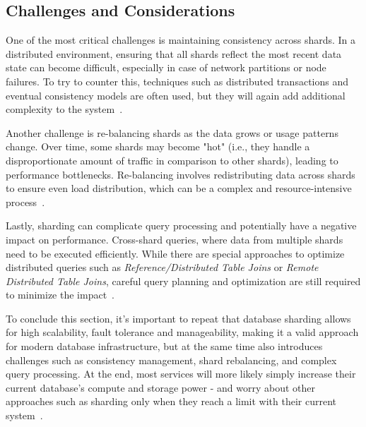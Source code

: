 \subsection{Challenges and Considerations}
One of the most critical challenges is maintaining consistency across shards. In a distributed environment, ensuring that all shards reflect the most recent data state can become difficult, especially in case of network partitions or node failures. To try to counter this, techniques such as distributed transactions and eventual consistency models are often used, but they will again add additional complexity to the system~\parencite{skyline_joins}.

Another challenge is re-balancing shards as the data grows or usage patterns change. Over time, some shards may become "hot" (i.e., they handle a disproportionate amount of traffic in comparison to other shards), leading to performance bottlenecks. Re-balancing involves redistributing data across shards to ensure even load distribution, which can be a complex and resource-intensive process~\parencite{db_sharding_cloud}.

Lastly, sharding can complicate query processing and potentially have a negative impact on performance. Cross-shard queries, where data from multiple shards need to be executed efficiently. While there are special approaches to optimize distributed queries such as \textit{Reference/Distributed Table Joins} or \textit{Remote Distributed Table Joins}, careful query planning and optimization are still required to minimize the impact~\parencite{db_sharding_joins}.

To conclude this section, it's important to repeat that database sharding allows for high scalability, fault tolerance and manageability, making it a valid approach for modern database infrastructure, but at the same time also introduces challenges such as consistency management, shard rebalancing, and complex query processing. At the end, most services will more likely simply increase their current database's compute and storage power - and worry about other approaches such as sharding only when they reach a limit with their current system~\parencite{db_sharding_newsql}.   
